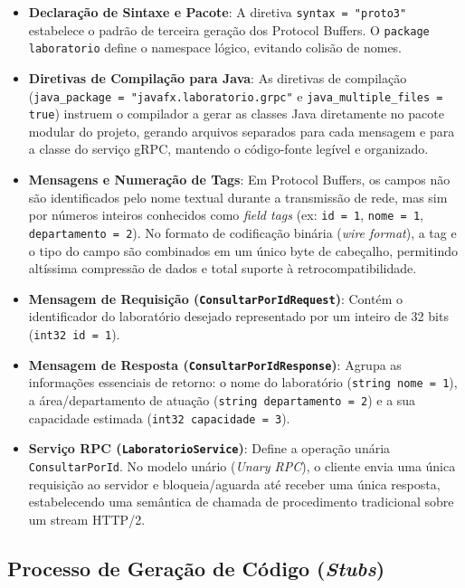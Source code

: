 \documentclass[12pt,a4paper]{article}
\begin{document}
\begin{itemize}
    \item \textbf{Declaração de Sintaxe e Pacote}: A diretiva \texttt{syntax = "proto3"} estabelece o padrão de terceira geração dos Protocol Buffers. O \texttt{package laboratorio} define o namespace lógico, evitando colisão de nomes.
    \item \textbf{Diretivas de Compilação para Java}: As diretivas de compilação (\texttt{java\_package = "javafx.}\allowbreak\texttt{laboratorio.grpc"} e \texttt{java\_multiple\_files = true}) instruem o compilador a gerar as classes Java diretamente no pacote modular do projeto, gerando arquivos separados para cada mensagem e para a classe do serviço gRPC, mantendo o código-fonte legível e organizado.
    \item \textbf{Mensagens e Numeração de Tags}: Em Protocol Buffers, os campos não são identificados pelo nome textual durante a transmissão de rede, mas sim por números inteiros conhecidos como \textit{field tags} (ex: \texttt{id = 1}, \texttt{nome = 1}, \texttt{departamento = 2}). No formato de codificação binária (\textit{wire format}), a tag e o tipo do campo são combinados em um único byte de cabeçalho, permitindo altíssima compressão de dados e total suporte à retrocompatibilidade.
    \item \textbf{Mensagem de Requisição (\texttt{ConsultarPorIdRequest})}: Contém o identificador do laboratório desejado representado por um inteiro de 32 bits (\texttt{int32 id = 1}).
    \item \textbf{Mensagem de Resposta (\texttt{ConsultarPorIdResponse})}: Agrupa as informações essenciais de retorno: o nome do laboratório (\texttt{string nome = 1}), a área/departamento de atuação (\texttt{string departamento = 2}) e a sua capacidade estimada (\texttt{int32 capacidade = 3}).
    \item \textbf{Serviço RPC (\texttt{LaboratorioService})}: Define a operação unária \texttt{ConsultarPorId}. No modelo unário (\textit{Unary RPC}), o cliente envia uma única requisição ao servidor e bloqueia/aguarda até receber uma única resposta, estabelecendo uma semântica de chamada de procedimento tradicional sobre um stream HTTP/2.
\end{itemize}

\subsection{Processo de Geração de Código (\textit{Stubs})}
\end{document}
